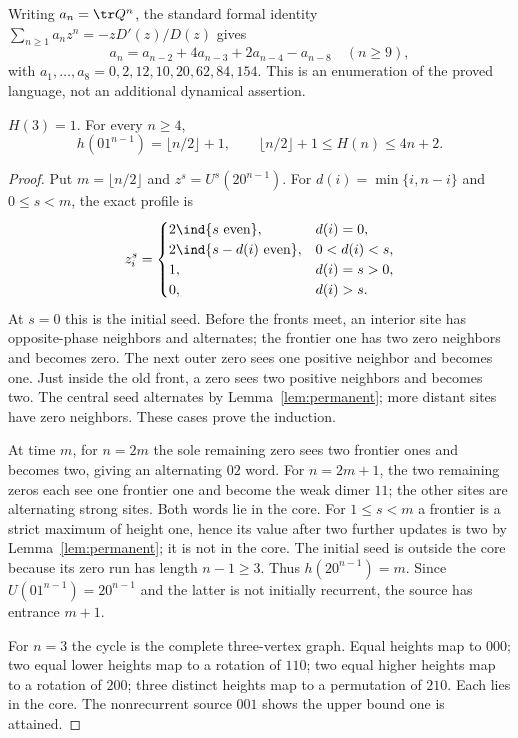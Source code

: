 Writing $a_n=\tr Q^n$, the standard formal identity
$\sum_{n\ge1}a_nz^n=-zD'(z)/D(z)$ gives
\[
 a_n=a_{n-2}+4a_{n-3}+2a_{n-4}-a_{n-8}\quad(n\ge9),
\]
with $a_1,\ldots,a_8=0,2,12,10,20,62,84,154$. This is an enumeration
of the proved language, not an additional dynamical assertion.

\begin{proposition}\label{prop:seed}
 $H(3)=1$. For every $n\ge4$,
 \[
 h(01^{n-1})=\lfloor n/2\rfloor+1,
 \qquad \lfloor n/2\rfloor+1\le H(n)\le4n+2.
 \]
\end{proposition}
\begin{proof}
 Put $m=\lfloor n/2\rfloor$ and $z^s=U^s(20^{n-1})$. For
 $d(i)=\min\{i,n-i\}$ and $0\le s<m$, the exact profile is
 \begin{equation}\label{eq:seed}
 z_i^s=\begin{cases}
 2\ind{s\text{ even}},&d(i)=0,\\
 2\ind{s-d(i)\text{ even}},&0<d(i)<s,\\
 1,&d(i)=s>0,\\
 0,&d(i)>s.
 \end{cases}
 \end{equation}
 At $s=0$ this is the initial seed. Before the fronts meet, an interior
 site has opposite-phase neighbors and alternates; the frontier one
 has two zero neighbors and becomes zero. The next outer zero sees
 one positive neighbor and becomes one. Just inside the old front,
 a zero sees two positive neighbors and becomes two. The central
 seed alternates by Lemma~\ref{lem:permanent}; more distant sites
 have zero neighbors. These cases prove the induction.

 At time $m$, for $n=2m$ the sole remaining zero sees two frontier
 ones and becomes two, giving an alternating $02$ word. For $n=2m+1$,
 the two remaining zeros each see one frontier one and become the
 weak dimer $11$; the other sites are alternating strong sites. Both
 words lie in the core. For $1\le s<m$ a frontier is a strict maximum
 of height one, hence its value after two further updates is two by
 Lemma~\ref{lem:permanent}; it is not in the core. The initial seed
 is outside the core because its zero run has length $n-1\ge3$.
 Thus $h(20^{n-1})=m$. Since $U(01^{n-1})=20^{n-1}$ and the latter
 is not initially recurrent, the source has entrance $m+1$.

 For $n=3$ the cycle is the complete three-vertex graph. Equal heights
 map to $000$; two equal lower heights map to a rotation of $110$;
 two equal higher heights map to a rotation of $200$; three distinct
 heights map to a permutation of $210$. Each lies in the core.
 The nonrecurrent source $001$ shows the upper bound one is attained.
\end{proof}

